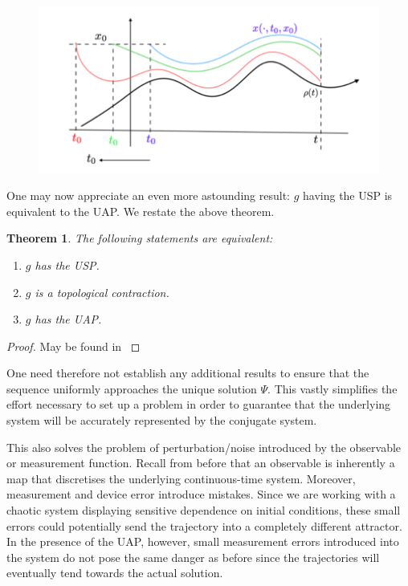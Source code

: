 \documentclass[a4paper,12pt,twoside]{report}
\newtheorem{Theorem}{Theorem}[]
\begin{document}
\begin{figure}[ht]
  \includegraphics[scale=0.4]{_memloss_conttime.png}
  \centering
{}
\label{fig:memloss_conttime.png} 
\end{figure}

One may now appreciate an even more astounding result: $g$ having the USP is equivalent to the UAP. We restate the above theorem.

\begin{Theorem}\label{thm_usp-contr-uap}
  The following statements are equivalent:
  \vspace{-8mm}
  \begin{enumerate}[noitemsep, label=\roman*.]
    \item $g$ has the USP.
    \item $g$ is a topological contraction.
    \item $g$ has the UAP.
  \end{enumerate}
\end{Theorem}
\begin{proof}
  May be found in \cite[Th.1]{Manju_Nonlinearity}
\end{proof}

One need therefore not establish any additional results to ensure that the sequence uniformly approaches the unique solution $\Psi$. This vastly simplifies the effort necessary to set up a problem in order to guarantee that the underlying system will be accurately represented by the conjugate system.

This also solves the problem of perturbation/noise introduced by the observable or measurement function. Recall from before that an observable is inherently a map that discretises the underlying continuous-time system. Moreover, measurement and device error introduce mistakes. Since we are working with a chaotic system displaying sensitive dependence on initial conditions, these small errors could potentially send the trajectory into a completely different attractor. 
In the presence of the UAP, however, small measurement errors introduced into the system do not pose the same danger as before since the trajectories will eventually tend towards the actual solution.
\end{document}
